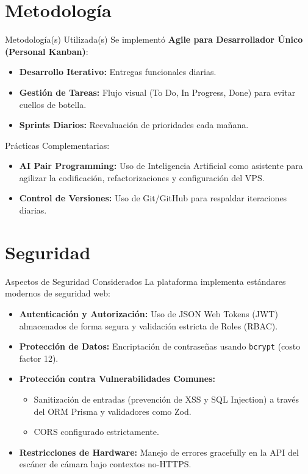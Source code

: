 \documentclass{beamer}
\begin{document}
\section{Metodología}
\begin{frame}{Metodología(s) Utilizada(s)}
  Se implementó \textbf{Agile para Desarrollador Único (Personal Kanban)}:
  \begin{itemize}
      \item \textbf{Desarrollo Iterativo:} Entregas funcionales diarias.
      \item \textbf{Gestión de Tareas:} Flujo visual (To Do, In Progress, Done) para evitar cuellos de botella.
      \item \textbf{Sprints Diarios:} Reevaluación de prioridades cada mañana.
  \end{itemize}
  \vspace{0.3cm}
  Prácticas Complementarias:
  \begin{itemize}
      \item \textbf{AI Pair Programming:} Uso de Inteligencia Artificial como asistente para agilizar la codificación, refactorizaciones y configuración del VPS.
      \item \textbf{Control de Versiones:} Uso de Git/GitHub para respaldar iteraciones diarias.
  \end{itemize}
\end{frame}

\section{Seguridad}
\begin{frame}{Aspectos de Seguridad Considerados}
  La plataforma implementa estándares modernos de seguridad web:
  \vspace{0.2cm}
  \begin{itemize}
      \item \textbf{Autenticación y Autorización:} Uso de JSON Web Tokens (JWT) almacenados de forma segura y validación estricta de Roles (RBAC).
      \item \textbf{Protección de Datos:} Encriptación de contraseñas usando \texttt{bcrypt} (costo factor 12).
      \item \textbf{Protección contra Vulnerabilidades Comunes:}
      \begin{itemize}
          \item Sanitización de entradas (prevención de XSS y SQL Injection) a través del ORM Prisma y validadores como Zod.
          \item CORS configurado estrictamente.
      \end{itemize}
      \item \textbf{Restricciones de Hardware:} Manejo de errores gracefully en la API del escáner de cámara bajo contextos no-HTTPS.
  \end{itemize}
\end{frame}
\end{document}
